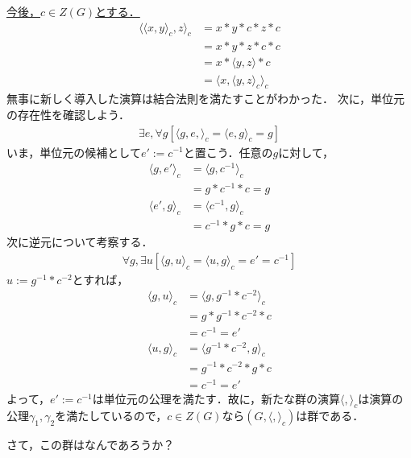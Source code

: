 \documentclass[dvipdfmx,12pt]{jsarticle}
\begin{document}
\underline{今後，$c \in Z(G)$とする．}
\begin{align*}
\langle \langle x, y \rangle_c , z \rangle_c &= x*y*c*z*c \\
&= x * y*z*c *c \\
&= x * \langle y,z \rangle * c \\
&= \langle x, \langle y,z \rangle_c \rangle_c
\end{align*}
無事に新しく導入した演算は結合法則を満たすことがわかった．
次に，単位元の存在性を確認しよう．
\begin{align*}
\exists e ,\forall g [\langle g,e , \rangle_c = \langle e,g \rangle_c = g]
\end{align*}
いま，単位元の候補として$e':=c^{-1}$と置こう．任意の$g$に対して，
\begin{align*}
\langle g,e' \rangle_c &= \langle g,c^{-1} \rangle_c \\
&=g * c^{-1} * c = g
\end{align*}
\begin{align*}
\langle e',g \rangle_c &= \langle c^{-1},g \rangle_c \\
&=c^{-1} * g * c = g
\end{align*}
次に逆元について考察する．
\begin{align*}
\forall g,\exists u [\langle g,u \rangle_c = \langle u,g \rangle_c = e' = c^{-1}]
\end{align*}
$u:=g^{-1}*c^{-2}$とすれば，
\begin{align*}
\langle g,u \rangle_c &= \langle g,g^{-1}*c^{-2} \rangle_c \\
&=g * g^{-1}*c^{-2} *c \\
& = c^{-1} = e'
\end{align*}
\begin{align*}
\langle u,g \rangle_c &= \langle g^{-1}*c^{-2},g \rangle_c \\
&=g^{-1}*c^{-2} * g *c\\
& = c^{-1} = e'
\end{align*}
よって，$e':=c^{-1}は単位元の公理を満たす．$故に，新たな群の演算$\langle , \rangle_c$は演算の公理$\gamma_1, \gamma_2$を満たしているので，$c \in Z(G)$なら$(G,\langle , \rangle_c)$は群である．

さて，この群はなんであろうか？


\thispagestyle{empty}
\end{document}
